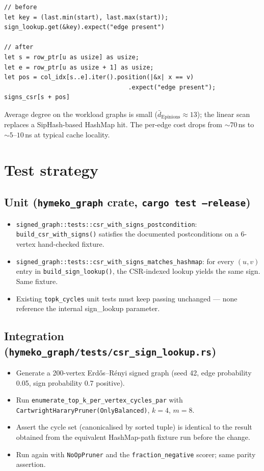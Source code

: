 \documentclass[a4paper,11pt]{article}
\begin{document}
\begin{lstlisting}
// before
let key = (last.min(start), last.max(start));
sign_lookup.get(&key).expect("edge present")

// after
let s = row_ptr[u as usize] as usize;
let e = row_ptr[u as usize + 1] as usize;
let pos = col_idx[s..e].iter().position(|&x| x == v)
                                  .expect("edge present");
signs_csr[s + pos]
\end{lstlisting}

Average degree on the workload graphs is small ($\bar d_{\text{Epinions}}
\approx 13$); the linear scan replaces a SipHash-based HashMap hit.
The per-edge cost drops from $\sim 70$\,ns to $\sim 5$--$10$\,ns at
typical cache locality.

\section*{Test strategy}

\subsection*{Unit (\texttt{hymeko\_graph} crate, \texttt{cargo test --release})}

\begin{itemize}
  \item \texttt{signed\_graph::tests::csr\_with\_signs\_postcondition}:
    \texttt{build\_csr\_with\_signs()} satisfies the documented
    postconditions on a 6-vertex hand-checked fixture.
  \item \texttt{signed\_graph::tests::csr\_with\_signs\_matches\_hashmap}:
    for every $(u, v)$ entry in
    \texttt{build\_sign\_lookup()}, the CSR-indexed lookup yields the
    same sign. Same fixture.
  \item Existing \texttt{topk\_cycles} unit tests must keep passing
    unchanged — none reference the internal sign\_lookup parameter.
\end{itemize}

\subsection*{Integration (\texttt{hymeko\_graph/tests/csr\_sign\_lookup.rs})}

\begin{itemize}
  \item Generate a 200-vertex Erdős–Rényi signed graph (seed 42, edge
    probability 0.05, sign probability 0.7 positive).
  \item Run \texttt{enumerate\_top\_k\_per\_vertex\_cycles\_par} with
    \texttt{CartwrightHararyPruner(OnlyBalanced)}, $k=4$, $m=8$.
  \item Assert the cycle set (canonicalised by sorted tuple) is
    identical to the result obtained from the equivalent HashMap-path
    fixture run before the change.
  \item Run again with \texttt{NoOpPruner} and the
    \texttt{fraction\_negative} scorer; same parity assertion.
\end{itemize}
\end{document}
